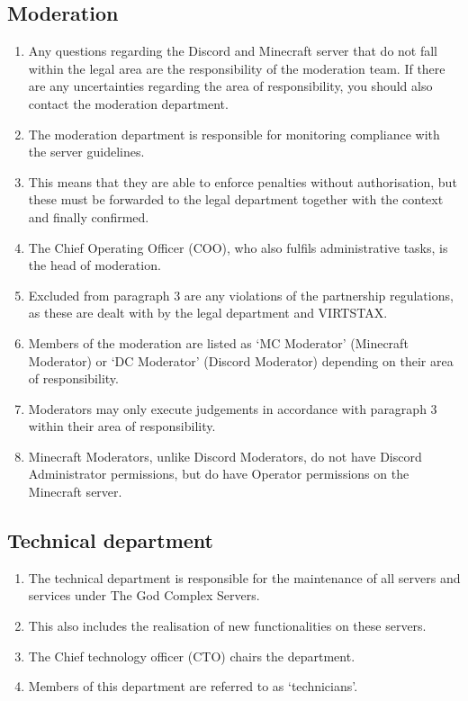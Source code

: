 \documentclass{article}
\begin{document}
\subsection{Moderation}\label{support}
\begin{enumerate}[(1)]
	\item Any questions regarding the Discord and Minecraft server that do not fall within the legal area are the responsibility of the moderation team. If there are any uncertainties regarding the area of responsibility, you should also contact the moderation department.
	\item The moderation department is responsible for monitoring compliance with the server guidelines.
	\item This means that they are able to enforce penalties without authorisation, but these must be forwarded to the legal department together with the context and finally confirmed.
	\item The Chief Operating Officer (COO), who also fulfils administrative tasks, is the head of moderation.
	\item Excluded from paragraph 3 are any violations of the partnership regulations, as these are dealt with by the legal department and VIRTSTAX.
	\item Members of the moderation are listed as `MC Moderator' (Minecraft Moderator) or `DC Moderator' (Discord Moderator) depending on their area of responsibility.
	\item Moderators may only execute judgements in accordance with paragraph 3 within their area of responsibility.
	\item Minecraft Moderators, unlike Discord Moderators, do not have Discord Administrator permissions, but do have Operator permissions on the Minecraft server.
\end{enumerate}

\subsection{Technical department}
\begin{enumerate}[(1)]
	\item The technical department is responsible for the maintenance of all servers and services under The God Complex Servers.
	\item This also includes the realisation of new functionalities on these servers.
	\item The Chief technology officer (CTO) chairs the department.
	\item Members of this department are referred to as `technicians'.
\end{enumerate}
\end{document}
